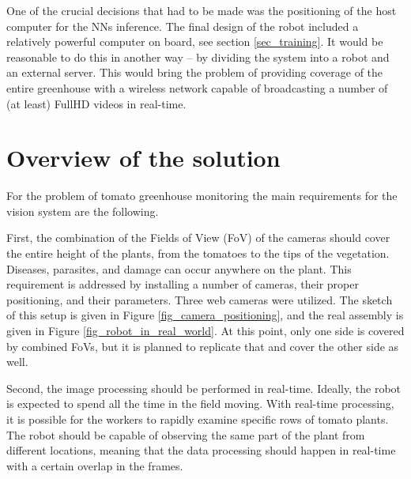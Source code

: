 \begin{description}
One of the crucial decisions that had to be made was the positioning of the host computer for the NNs inference.
The final design of the robot included a relatively powerful computer on board, see section \ref{sec_training}.
It would be reasonable to do this in another way – by dividing the system into a robot and an external server.
This would bring the problem of providing coverage of the entire greenhouse with a wireless network capable of broadcasting a number of (at least) FullHD videos in real-time.
\section{Overview of the solution}
\label{Overview of the solution}
For the problem of tomato greenhouse monitoring the main requirements for the vision system are the following.

First, the combination of the Fields of View (FoV) of the cameras should cover the entire height of the plants, from the tomatoes to the tips of the vegetation.
Diseases, parasites, and damage can occur anywhere on the plant.
This requirement is addressed by installing a number of cameras, their proper positioning, and their parameters.
Three web cameras were utilized.
The sketch of this setup is given in Figure \ref{fig_camera_positioning}, and the real assembly is given in Figure \ref{fig_robot_in_real_world}.
At this point, only one side is covered by combined FoVs, but it is planned to replicate that and cover the other side as well.

Second, the image processing should be performed in real-time. 
Ideally, the robot is expected to spend all the time in the field moving. 
With real-time processing, it is possible for the workers to rapidly examine specific rows of tomato plants.
The robot should be capable of observing the same part of the plant from different locations, meaning that the data processing should happen in real-time with a certain overlap in the frames.


\end{description}
